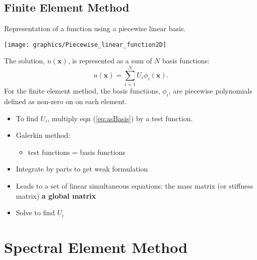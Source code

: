 \begin{minipage}[c][1\totalheight][t]{0.38\columnwidth}%

\subsection*{Finite Element Method}

Representation of a function using a piecewise linear basis.
\begin{center}
\texttt{[image: graphics/Piecewise\_linear\_function2D]}
\par\end{center}%
\end{minipage}\hfill{}%
\begin{minipage}[c][1\totalheight][t]{0.58\columnwidth}%
The solution, $u(\mathbf{x})$, is represented as a sum of $N$ basis
functions:
\begin{equation}
u(\mathbf{x})=\sum_{i=1}^{N}U_{i}\phi_{i}(\mathbf{x}).\label{eq:asBasis}
\end{equation}
For the finite element method, the basis functions, $\phi_{i}$, are
piecewise polynomials defined as non-zero on on each element. 
\begin{itemize}
\item To find $U_{i}$, multiply eqn (\ref{eq:asBasis}) by a test function.
\item Galerkin method:
\begin{itemize}
\item test functions = basis functions
\end{itemize}
\item Integrate by parts to get weak formulation
\item Leads to a set of linear simultaneous equations: the mass matrix (or
stiffness matrix) \textendash{} \textbf{a global matrix}
\item Solve to find $U_{i}$
\end{itemize}
%
\end{minipage}

\clearpage{}

\section*{Spectral Element Method }

